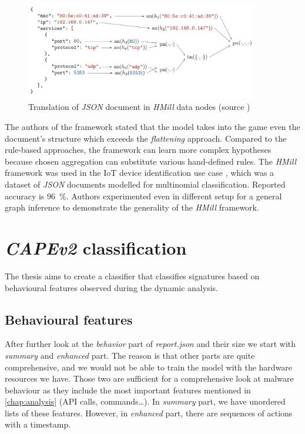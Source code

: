 
\begin{figure}[h]
    \centering
    \includegraphics[width=0.9\textwidth]{figures/translation.png}
    \caption{Translation of \emph{JSON} document in \emph{HMill} data nodes (source \cite{Mandlik2020})}
    \label{fig:jsonhmill}
\end{figure}

The authors of the framework stated that the model takes into the game even the document's structure which exceeds the \emph{flattening} approach. Compared to the rule-based approaches, the framework can learn more complex hypotheses because chosen aggregation can substitute various hand-defined rules. The \emph{HMill} framework was used in the IoT device identification use case \cite{Mandlik2020}, which was a dataset of \emph{JSON} documents modelled for multinomial classification. Reported accuracy is $96$~\%. Authors experimented even in different setup for a general graph inference to demonstrate the generality of the \emph{HMill} framework.


\section{\emph{CAPEv2} classification}
The thesis aims to create a classifier that classifies signatures based on behavioural features observed during the dynamic analysis.

\subsection{Behavioural features}
After further look at the \emph{behavior} part of \emph{report.json} and their size we start with \emph{summary} and \emph{enhanced} part. The reason is that other parts are quite comprehensive, and we would not be able to train the model with the hardware resources we have. Those two are sufficient for a comprehensive look at malware behaviour as they include the most important features mentioned in \ref{chap:analysis} (API calls, commands\dots). In \emph{summary} part, we have unordered lists of these features. However, in \emph{enhanced} part, there are sequences of actions with a timestamp.

